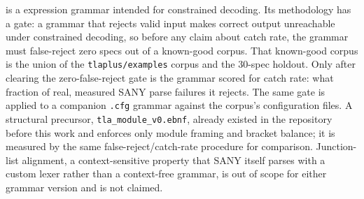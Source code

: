  \gfile{} is a \tlaplus{}
expression grammar intended for constrained decoding. Its methodology has a
gate: a grammar that rejects valid input makes correct output unreachable
under constrained decoding, so before any claim about catch rate, the
grammar must false-reject zero specs out of a known-good corpus. That
known-good corpus is the union of the \texttt{tlaplus/examples} corpus and
the 30-spec holdout. Only after clearing the zero-false-reject gate is the
grammar scored for catch rate: what fraction of real, measured SANY parse
failures it rejects. The same gate is applied to a companion \texttt{.cfg}
grammar against the corpus's configuration files. A structural precursor,
\texttt{tla\_module\_v0.ebnf}, already existed in the repository before this
work and enforces only module framing and bracket balance; it is measured by
the same false-reject/catch-rate procedure for comparison. Junction-list
alignment, a context-sensitive property that SANY itself parses with a
custom lexer rather than a context-free grammar, is out of scope for either
grammar version and is not claimed.
